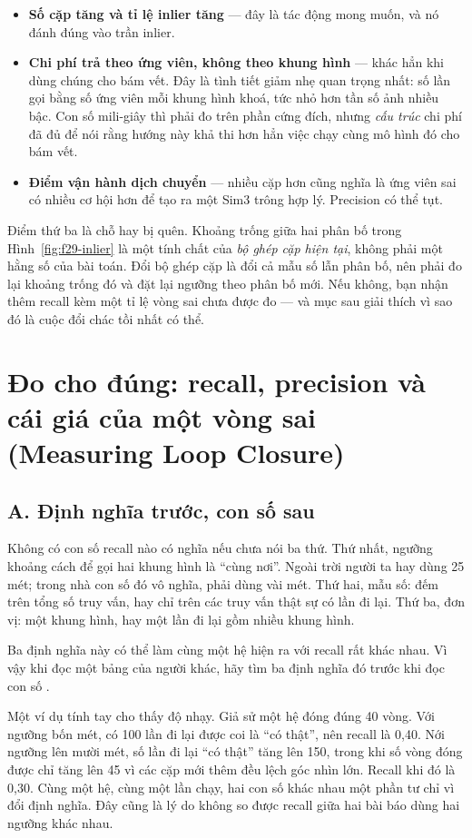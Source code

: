 \documentclass[../../deep_learning.tex]{subfiles}
\begin{document}
\begin{itemize}
\item \textbf{Số cặp tăng và tỉ lệ inlier tăng} --- đây là tác động mong muốn, và nó đánh đúng vào trần inlier.
\item \textbf{Chi phí trả theo ứng viên, không theo khung hình} --- khác hẳn khi dùng chúng cho bám vết. Đây là tình tiết giảm nhẹ quan trọng nhất: số lần gọi bằng số ứng viên mỗi khung hình khoá, tức nhỏ hơn tần số ảnh nhiều bậc. Con số mili-giây thì phải đo trên phần cứng đích, nhưng \emph{cấu trúc} chi phí đã đủ để nói rằng hướng này khả thi hơn hẳn việc chạy cùng mô hình đó cho bám vết.
\item \textbf{Điểm vận hành dịch chuyển} --- nhiều cặp hơn cũng nghĩa là ứng viên sai có nhiều cơ hội hơn để tạo ra một Sim3 trông hợp lý. Precision có thể tụt.
\end{itemize}

Điểm thứ ba là chỗ hay bị quên. Khoảng trống giữa hai phân bố trong Hình~\ref{fig:f29-inlier} là một tính chất của \emph{bộ ghép cặp hiện tại}, không phải một hằng số của bài toán. Đổi bộ ghép cặp là đổi cả mẫu số lẫn phân bố, nên phải đo lại khoảng trống đó và đặt lại ngưỡng theo phân bố mới. Nếu không, bạn nhận thêm recall kèm một tỉ lệ vòng sai chưa được đo --- và mục sau giải thích vì sao đó là cuộc đổi chác tồi nhất có thể.

\section{Đo cho đúng: recall, precision và cái giá của một vòng sai (Measuring Loop Closure)}

\subsection{A. Định nghĩa trước, con số sau}
Không có con số recall nào có nghĩa nếu chưa nói ba thứ. Thứ nhất, ngưỡng khoảng cách để gọi hai khung hình là ``cùng nơi''. Ngoài trời người ta hay dùng 25 mét; trong nhà con số đó vô nghĩa, phải dùng vài mét. Thứ hai, mẫu số: đếm trên tổng số truy vấn, hay chỉ trên các truy vấn thật sự có lần đi lại. Thứ ba, đơn vị: một khung hình, hay một lần đi lại gồm nhiều khung hình.

Ba định nghĩa này có thể làm cùng một hệ hiện ra với recall rất khác nhau. Vì vậy khi đọc một bảng của người khác, hãy tìm ba định nghĩa đó trước khi đọc con số \cite{f29lowry2016visual}.

Một ví dụ tính tay cho thấy độ nhạy. Giả sử một hệ đóng đúng 40 vòng. Với ngưỡng bốn mét, có 100 lần đi lại được coi là ``có thật'', nên recall là 0,40. Nới ngưỡng lên mười mét, số lần đi lại ``có thật'' tăng lên 150, trong khi số vòng đóng được chỉ tăng lên 45 vì các cặp mới thêm đều lệch góc nhìn lớn. Recall khi đó là 0,30. Cùng một hệ, cùng một lần chạy, hai con số khác nhau một phần tư chỉ vì đổi định nghĩa. Đây cũng là lý do không so được recall giữa hai bài báo dùng hai ngưỡng khác nhau.
\end{document}
